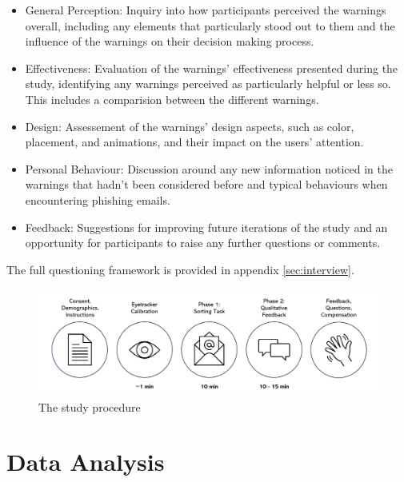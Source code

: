\documentclass[
  a4paper,  %
  twoside,  %
  bibliography=totoc,
  headsepline,
  cleardoublepage=empty,
  parskip=half,
  draft=false
]{scrbook}
\begin{document}
\begin{itemize}
    \item General Perception: Inquiry into how participants perceived the warnings overall, including any elements that particularly stood out to them and the influence of the warnings on their decision making process.
    \item Effectiveness: Evaluation of the warnings' effectiveness presented during the study, identifying any warnings perceived as particularly helpful or less so. This includes a comparision between the different warnings.
    \item Design: Assessement of the warnings' design aspects, such as color, placement, and animations, and their impact on the users' attention.
    \item Personal Behaviour: Discussion around any new information noticed in the warnings that hadn't been considered before and typical behaviours when encountering phishing emails.
    \item Feedback: Suggestions for improving future iterations of the study and an opportunity for participants to raise any further questions or comments. 
\end{itemize}
 
The full questioning framework is provided in appendix \ref{sec:interview}.

\begin{figure} [ht]
    \centering
    \includegraphics[width=1\linewidth]{figures/studysteps.png}
    \caption{The study procedure}
    \label{fig:steps}
\end{figure}

\section{Data Analysis}
\end{document}
